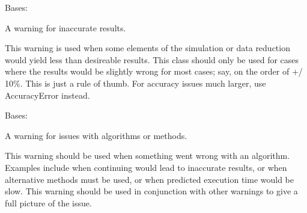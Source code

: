 \documentclass[letterpaper,11pt,english]{sphinxmanual}
\begin{document}

\begin{savenotes}\begin{fulllineitems}
\label{\detokenize{code/lezargus.library.logging:lezargus.library.logging.AccuracyWarning}}
\pysigstartsignatures
{}
\pysigstopsignatures
\sphinxAtStartPar
Bases: {\hyperref[\detokenize{code/lezargus.library.logging:lezargus.library.logging.LezargusWarning}]{}}

\sphinxAtStartPar
A warning for inaccurate results.

\sphinxAtStartPar
This warning is used when some elements of the simulation or data
reduction would yield less than desireable results. This class should only
be used for cases where the results would be slightly wrong for most
cases; say, on the order of +/\sphinxhyphen{} 10\%. This is just a rule of thumb. For
accuracy issues much larger, use AccuracyError instead.

\end{fulllineitems}\end{savenotes}


\begin{savenotes}\begin{fulllineitems}
\label{\detokenize{code/lezargus.library.logging:lezargus.library.logging.AlgorithmWarning}}
\pysigstartsignatures
{}
\pysigstopsignatures
\sphinxAtStartPar
Bases: {\hyperref[\detokenize{code/lezargus.library.logging:lezargus.library.logging.LezargusWarning}]{}}

\sphinxAtStartPar
A warning for issues with algorithms or methods.

\sphinxAtStartPar
This warning should be used when something went wrong with an algorithm.
Examples include when continuing would lead to inaccurate results, or
when alternative methods must be used, or when predicted execution time
would be slow. This warning should be used in conjunction with other
warnings to give a full picture of the issue.

\end{fulllineitems}\end{savenotes}
\end{document}
